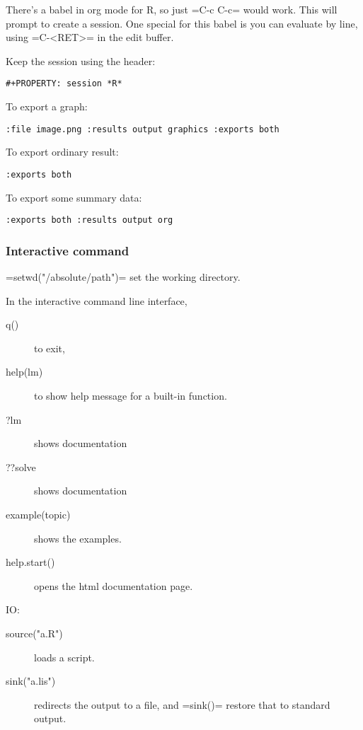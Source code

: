 There's a babel in org mode for R, so just =C-c C-c= would work.  This
will prompt to create a session.  One special for this babel is you
can evaluate by line, using =C-<RET>= in the edit buffer.

   Keep the session using the header:
\begin{lstlisting}
#+PROPERTY: session *R*
\end{lstlisting}

   To export a graph:

\begin{lstlisting}
:file image.png :results output graphics :exports both
\end{lstlisting}

   To export ordinary result:

\begin{lstlisting}
:exports both
\end{lstlisting}

   To export some summary data:

\begin{lstlisting}
:exports both :results output org
\end{lstlisting}

\subsubsection{Interactive command}
=setwd("/absolute/path")= set the working directory.

In the interactive command line interface,
\begin{description}
\item [q()] to exit, 
\item [help(lm)] to show help message for a built-in function.
\item [?lm] shows documentation
\item [??solve] shows documentation
\item [example(topic)] shows the examples.
\item [help.start()] opens the html documentation page.
\end{description}


IO:
\begin{description}
\item [source("a.R")] loads a script.
\item [sink("a.lis")] redirects the output to a file, and =sink()= restore that to standard output.
\end{description}


